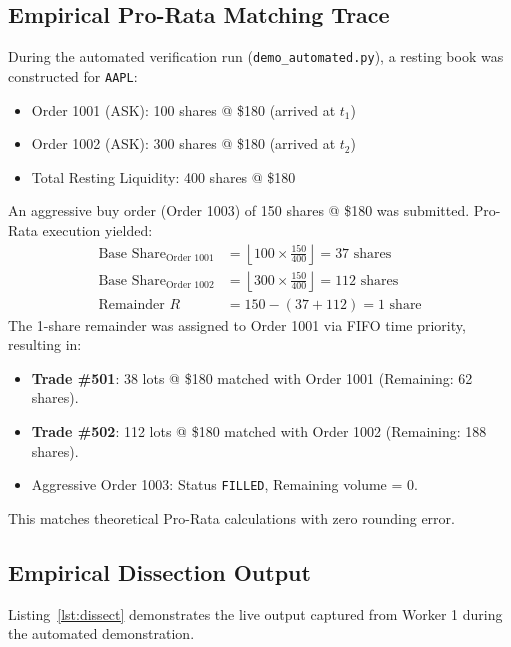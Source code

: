 \documentclass[11pt,a4paper]{article}
\begin{document}
\subsection{Empirical Pro-Rata Matching Trace}
During the automated verification run (\texttt{demo\_automated.py}), a resting book was constructed for \texttt{AAPL}:
\begin{itemize}
    \item Order 1001 (ASK): 100 shares @ \$180 (arrived at $t_1$)
    \item Order 1002 (ASK): 300 shares @ \$180 (arrived at $t_2$)
    \item Total Resting Liquidity: 400 shares @ \$180
\end{itemize}
An aggressive buy order (Order 1003) of 150 shares @ \$180 was submitted. Pro-Rata execution yielded:
\begin{align*}
\text{Base Share}_{\text{Order 1001}} &= \left\lfloor 100 \times \frac{150}{400} \right\rfloor = 37 \text{ shares} \\
\text{Base Share}_{\text{Order 1002}} &= \left\lfloor 300 \times \frac{150}{400} \right\rfloor = 112 \text{ shares} \\
\text{Remainder } R &= 150 - (37 + 112) = 1 \text{ share}
\end{align*}
The 1-share remainder was assigned to Order 1001 via FIFO time priority, resulting in:
\begin{itemize}
    \item \textbf{Trade \#501}: 38 lots @ \$180 matched with Order 1001 (Remaining: 62 shares).
    \item \textbf{Trade \#502}: 112 lots @ \$180 matched with Order 1002 (Remaining: 188 shares).
    \item Aggressive Order 1003: Status \texttt{FILLED}, Remaining volume = 0.
\end{itemize}
This matches theoretical Pro-Rata calculations with zero rounding error.

\subsection{Empirical Dissection Output}
Listing~\ref{lst:dissect} demonstrates the live output captured from Worker 1 during the automated demonstration.
\end{document}
